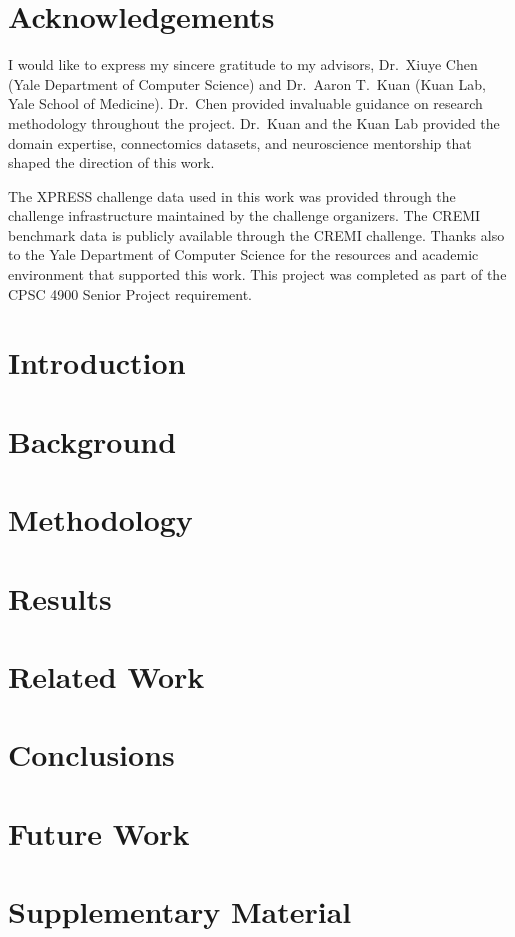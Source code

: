 \documentclass[12pt,twoside]{report}
\begin{document}


\chapter*{Acknowledgements}

I would like to express my sincere gratitude to my advisors, Dr.\ Xiuye Chen
(Yale Department of Computer Science) and Dr.\ Aaron T.\ Kuan (Kuan Lab, Yale
School of Medicine). Dr.\ Chen provided invaluable guidance on research
methodology throughout the project. Dr.\ Kuan and the Kuan Lab provided the
domain expertise, connectomics datasets, and neuroscience mentorship that
shaped the direction of this work.

The XPRESS challenge data used in this work was provided through the challenge
infrastructure maintained by the challenge organizers. The CREMI benchmark data
is publicly available through the CREMI challenge. Thanks also to the Yale
Department of Computer Science for the resources and academic environment that
supported this work. This project was completed as part of the CPSC 4900 Senior
Project requirement.

{
  \hypersetup{linkcolor=black}
  \tableofcontents
}

\clearpage



\chapter{Introduction}


\chapter{Background} \label{ch:background}


\chapter{Methodology} \label{ch:methodology}


\chapter{Results} \label{ch:results}


\chapter{Related Work} \label{ch:relatedwork}


\chapter{Conclusions} \label{ch:conclusion}


\chapter{Future Work} \label{ch:futurework}


\printbibliography

\appendix
\chapter{Supplementary Material} \label{ch:appendices}

\end{document}
